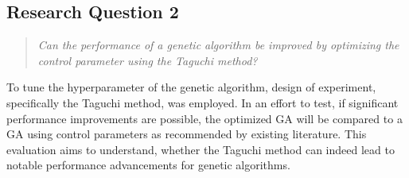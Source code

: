 \subsection{Research Question 2}
\begin{quote}
	\begin{em}
		\textit{Can the performance of a genetic algorithm be improved by optimizing the control parameter using the Taguchi method?}
	\end{em}
\end{quote}

To tune the hyperparameter of the genetic algorithm, design of experiment, specifically the Taguchi method, was employed. In an effort to test, if significant performance improvements are possible, the optimized GA will be compared to a GA using control parameters as recommended by existing literature. This evaluation aims to understand, whether  the Taguchi method can indeed lead to notable performance advancements for genetic algorithms.























